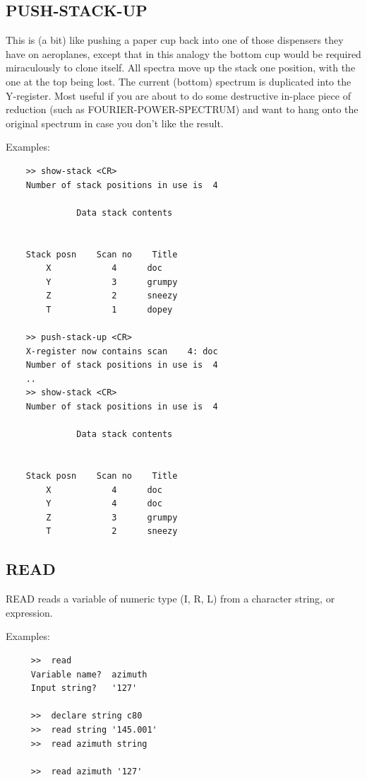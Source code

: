 \documentclass[11pt,twoside]{report}
\begin{document}
\subsection{PUSH-STACK-UP} 

This is (a bit) like pushing a paper cup back into one of those dispensers they
have on aeroplanes, except that in this analogy the bottom cup would be
required miraculously to clone itself. All spectra move up the stack one
position, with the one at the top being lost. The current (bottom) spectrum
is duplicated into the Y-register. Most useful if you are about to do some
destructive in-place piece of reduction (such as FOURIER-POWER-SPECTRUM) and
want to hang onto the original spectrum in case you don't like the result.

Examples:
\begin{verbatim}
    >> show-stack <CR>
    Number of stack positions in use is  4

              Data stack contents


    Stack posn    Scan no    Title
        X            4      doc                       
        Y            3      grumpy                    
        Z            2      sneezy                    
        T            1      dopey                     

    >> push-stack-up <CR>
    X-register now contains scan    4: doc
    Number of stack positions in use is  4
    ..
    >> show-stack <CR>
    Number of stack positions in use is  4

              Data stack contents


    Stack posn    Scan no    Title
        X            4      doc                       
        Y            4      doc                       
        Z            3      grumpy                    
        T            2      sneezy                    

\end{verbatim}


\subsection{READ}

READ reads a variable of numeric type (I, R, L) from a character string,
or expression.

Examples:  
\begin{verbatim}
     >>  read
     Variable name?  azimuth
     Input string?   '127'

     >>  declare string c80
     >>  read string '145.001'
     >>  read azimuth string

     >>  read azimuth '127'
\end{verbatim}
\end{document}
